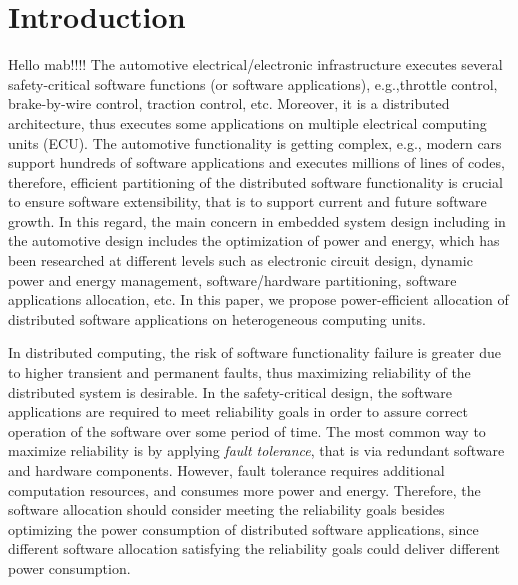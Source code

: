 \section{Introduction}
Hello mab!!!! The automotive electrical/electronic infrastructure executes several safety-critical software functions (or software applications), e.g.,throttle control, brake-by-wire control, traction control, etc. Moreover, it is a distributed architecture, thus executes some applications on multiple electrical computing units (ECU). The automotive functionality is getting complex, e.g., modern cars support hundreds of software applications and executes millions of lines of codes, therefore, efficient partitioning of the distributed software functionality is crucial to ensure software extensibility, that is to support current and future software growth. In this regard, the main concern in embedded system design including in the automotive design includes the optimization of power and energy, which has been researched at different levels such as electronic circuit design, dynamic power and energy management, software/hardware partitioning, software applications allocation, etc. In this paper, we propose power-efficient allocation of distributed software applications on heterogeneous computing units.

In distributed computing, the risk of software functionality failure is greater due to higher transient and permanent faults, thus maximizing reliability of the distributed system is desirable. In the safety-critical design, the software applications are required to meet reliability goals in order to assure correct operation of the software over some period of time. The most common way to maximize reliability is by applying \textit{fault tolerance}, that is via redundant software and hardware components. However, fault tolerance requires additional computation resources, and consumes more power and energy. Therefore, the software allocation should consider meeting the reliability goals besides optimizing the power consumption of distributed software applications, since different software allocation satisfying the reliability goals could deliver different power consumption.

